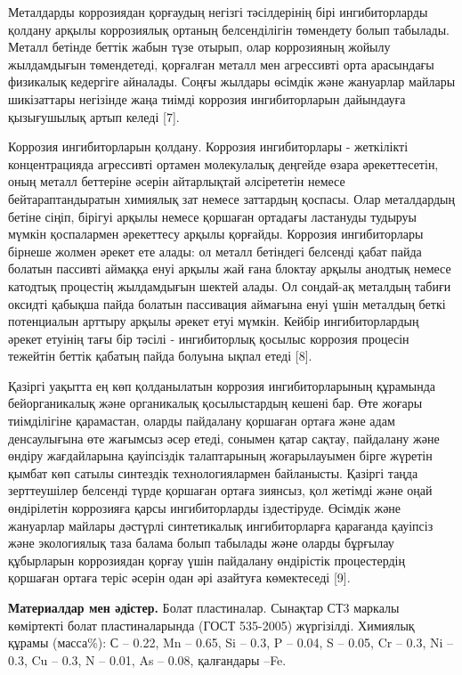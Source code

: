 Металдарды коррозиядан қорғаудың негізгі тәсілдерінің бірі
ингибиторларды қолдану арқылы коррозиялық ортаның белсенділігін
төмендету болып табылады. Металл бетінде беттік жабын түзе отырып, олар
коррозияның жойылу жылдамдығын төмендетеді, қорғалған металл мен
агрессивті орта арасындағы физикалық кедергіге айналады. Соңғы жылдары
өсімдік және жануарлар майлары шикізаттары негізінде жаңа тиімді
коррозия ингибиторларын дайындауға қызығушылық артып келеді {[}7{]}.

Коррозия ингибиторларын қолдану. Коррозия ингибиторлары - жеткілікті
концентрацияда агрессивті ортамен молекулалық деңгейде өзара
әрекеттесетін, оның металл беттеріне әсерін айтарлықтай әлсірететін
немесе бейтараптандыратын химиялық зат немесе заттардың қоспасы. Олар
металдардың бетіне сіңіп, бірігуі арқылы немесе қоршаған ортадағы
ластануды тудыруы мүмкін қоспалармен әрекеттесу арқылы қорғайды.
Коррозия ингибиторлары бірнеше жолмен әрекет ете алады: ол металл
бетіндегі белсенді қабат пайда болатын пассивті аймаққа енуі арқылы жай
ғана блоктау арқылы анодтық немесе катодтық процестің жылдамдығын шектей
алады. Ол сондай-ақ металдың табиғи оксидті қабықша пайда болатын
пассивация аймағына енуі үшін металдың беткі потенциалын арттыру арқылы
әрекет етуі мүмкін. Кейбір ингибиторлардың әрекет етуінің тағы бір
тәсілі - ингибиторлық қосылыс коррозия процесін тежейтін беттік қабатың
пайда болуына ықпал етеді {[}8{]}.

Қазіргі уақытта ең көп қолданылатын коррозия ингибиторларының құрамында
бейорганикалық және органикалық қосылыстардың кешені бар. Өте жоғары
тиімділігіне қарамастан, оларды пайдалану қоршаған ортаға және адам
денсаулығына өте жағымсыз әсер етеді, сонымен қатар сақтау, пайдалану
және өндіру жағдайларына қауіпсіздік талаптарының жоғарылауымен бірге
жүретін қымбат көп сатылы синтездік технологиялармен байланысты. Қазіргі
таңда зерттеушілер белсенді түрде қоршаған ортаға зиянсыз, қол жетімді
және оңай өндірілетін коррозияға қарсы ингибиторларды іздестіруде.
Өсімдік және жануарлар майлары дәстүрлі синтетикалық ингибиторларға
қарағанда қауіпсіз және экологиялық таза балама болып табылады және
оларды бұрғылау құбырларын коррозиядан қорғау үшін пайдалану өндірістік
процестердің қоршаған ортаға теріс әсерін одан әрі азайтуға көмектеседі
{[}9{]}.

{\bfseries Материалдар мен әдістер.} Болат пластиналар. Сынақтар СТ3
маркалы көміртекті болат пластиналарында (ГОСТ 535-2005) жүргізілді.
Химиялық құрамы (масса\%): С -- 0.22, Mn -- 0.65, Si -- 0.3, P -- 0.04,
S -- 0.05, Cr -- 0.3, Ni -- 0.3, Cu -- 0.3, N -- 0.01, As -- 0.08,
қалғандары --Fe.

